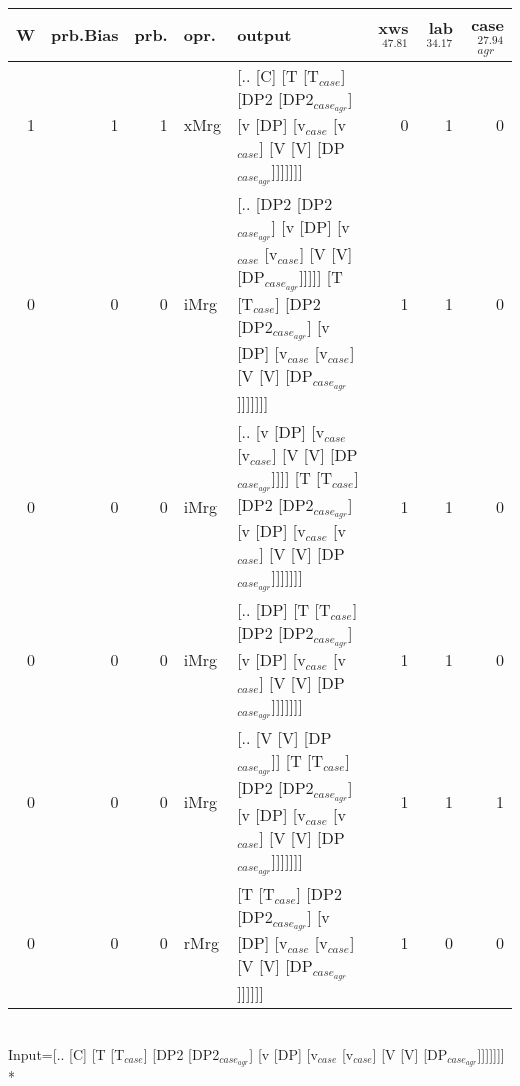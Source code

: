 \begin{tabularx}{\linewidth}{rrrlXrrr}
\hline
   W &   prb.Bias &   prb. & opr.   & output                                                                                                                                                        &   xws$^{47.81}$ &   lab$^{34.17}$ &   case$_{agr}^{27.94}$ \\
\hline
   1 &       1 &   1 & xMrg & [.. [C] [T [T$_{case}$] [DP2 [DP2$_{case_{agr}}$] [v [DP] [v$_{case}$ [v$_{case}$] [V [V] [DP$_{case_{agr}}$]]]]]]]                                                                   &             0 &             1 &                  0 \\
   0 &       0 &   0 & iMrg & [.. [DP2 [DP2$_{case_{agr}}$] [v [DP] [v$_{case}$ [v$_{case}$] [V [V] [DP$_{case_{agr}}$]]]]] [T [T$_{case}$] [DP2 [DP2$_{case_{agr}}$] [v [DP] [v$_{case}$ [v$_{case}$] [V [V] [DP$_{case_{agr}}$]]]]]]] &             1 &             1 &                  0 \\
   0 &       0 &   0 & iMrg & [.. [v [DP] [v$_{case}$ [v$_{case}$] [V [V] [DP$_{case_{agr}}$]]]] [T [T$_{case}$] [DP2 [DP2$_{case_{agr}}$] [v [DP] [v$_{case}$ [v$_{case}$] [V [V] [DP$_{case_{agr}}$]]]]]]]                      &             1 &             1 &                  0 \\
   0 &       0 &   0 & iMrg & [.. [DP] [T [T$_{case}$] [DP2 [DP2$_{case_{agr}}$] [v [DP] [v$_{case}$ [v$_{case}$] [V [V] [DP$_{case_{agr}}$]]]]]]]                                                                  &             1 &             1 &                  0 \\
   0 &       0 &   0 & iMrg & [.. [V [V] [DP$_{case_{agr}}$]] [T [T$_{case}$] [DP2 [DP2$_{case_{agr}}$] [v [DP] [v$_{case}$ [v$_{case}$] [V [V] [DP$_{case_{agr}}$]]]]]]]                                                 &             1 &             1 &                  1 \\
   0 &       0 &   0 & rMrg & [T [T$_{case}$] [DP2 [DP2$_{case_{agr}}$] [v [DP] [v$_{case}$ [v$_{case}$] [V [V] [DP$_{case_{agr}}$]]]]]]                                                                            &             1 &             0 &                  0 \\
\hline
\end{tabularx}\endgroup\\
\begingroup\scriptsize Input=[.. [C] [T [T$_{case}$] [DP2 [DP2$_{case_{agr}}$] [v [DP] [v$_{case}$ [v$_{case}$] [V [V] [DP$_{case_{agr}}$]]]]]]]\\*
